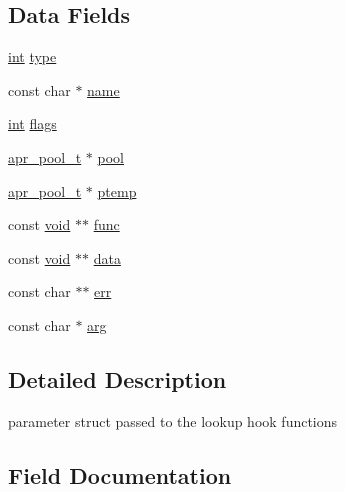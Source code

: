 \subsection*{Data Fields}
\begin{DoxyCompactItemize}
\item 
\hyperlink{pcre_8txt_a42dfa4ff673c82d8efe7144098fbc198}{int} \hyperlink{structap__expr__lookup__parms_a41128f8553216bf8632021032445d829}{type}
\item 
const char $\ast$ \hyperlink{structap__expr__lookup__parms_a57dd99d90307bd478219eb051feaa3a4}{name}
\item 
\hyperlink{pcre_8txt_a42dfa4ff673c82d8efe7144098fbc198}{int} \hyperlink{structap__expr__lookup__parms_ab278497f84abc9c4bc823361bd851a8b}{flags}
\item 
\hyperlink{structapr__pool__t}{apr\+\_\+pool\+\_\+t} $\ast$ \hyperlink{structap__expr__lookup__parms_a43b9d610979cae341aaf599df010ba80}{pool}
\item 
\hyperlink{structapr__pool__t}{apr\+\_\+pool\+\_\+t} $\ast$ \hyperlink{structap__expr__lookup__parms_ac0c513ab310bbd3d193ef2c7cccd4b08}{ptemp}
\item 
const \hyperlink{group__MOD__ISAPI_gacd6cdbf73df3d9eed42fa493d9b621a6}{void} $\ast$$\ast$ \hyperlink{structap__expr__lookup__parms_a75cf93f0a5f586e2487c451718b78f1e}{func}
\item 
const \hyperlink{group__MOD__ISAPI_gacd6cdbf73df3d9eed42fa493d9b621a6}{void} $\ast$$\ast$ \hyperlink{structap__expr__lookup__parms_a20bf2c354b95644f425690e44758a932}{data}
\item 
const char $\ast$$\ast$ \hyperlink{structap__expr__lookup__parms_a039a4890bcae06435700173d456642e5}{err}
\item 
const char $\ast$ \hyperlink{structap__expr__lookup__parms_af3447fe82681f51295039402e76997b5}{arg}
\end{DoxyCompactItemize}


\subsection{Detailed Description}
parameter struct passed to the lookup hook functions 

\subsection{Field Documentation}
